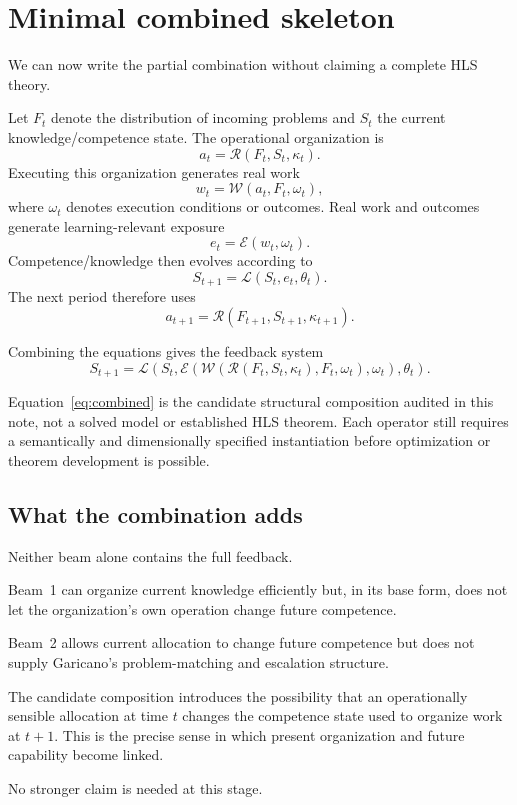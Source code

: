 \section{Minimal combined skeleton}

We can now write the partial combination without claiming a complete HLS theory.

Let \(F_t\) denote the distribution of incoming problems and \(S_t\) the current
knowledge/competence state. The operational organization is
\begin{equation}
a_t=\mathcal R(F_t,S_t,\kappa_t).
\end{equation}
Executing this organization generates real work
\begin{equation}
w_t=\mathcal W(a_t,F_t,\omega_t),
\end{equation}
where \(\omega_t\) denotes execution conditions or outcomes. Real work and outcomes generate
learning-relevant exposure
\begin{equation}
e_t=\mathcal E(w_t,\omega_t).
\end{equation}
Competence/knowledge then evolves according to
\begin{equation}
S_{t+1}=\mathcal L(S_t,e_t,\theta_t).
\end{equation}
The next period therefore uses
\begin{equation}
a_{t+1}=\mathcal R(F_{t+1},S_{t+1},\kappa_{t+1}).
\end{equation}

Combining the equations gives the feedback system
\begin{equation}
S_{t+1}
=
\mathcal L\!\left(
S_t,
\mathcal E\!\left(
\mathcal W\!\left(
\mathcal R(F_t,S_t,\kappa_t),
F_t,\omega_t
\right),
\omega_t
\right),
\theta_t
\right).
\label{eq:combined}
\end{equation}

Equation~\eqref{eq:combined} is the candidate structural composition audited in this note,
not a solved model or established HLS theorem. Each operator still requires a semantically
and dimensionally specified instantiation before optimization or theorem development is
possible.

\subsection{What the combination adds}

Neither beam alone contains the full feedback.

Beam~1 can organize current knowledge efficiently but, in its base form, does not let the
organization's own operation change future competence.

Beam~2 allows current allocation to change future competence but does not supply Garicano's
problem-matching and escalation structure.

The candidate composition introduces the possibility that an operationally sensible allocation at
time \(t\) changes the competence state used to organize work at \(t+1\). This is the precise
sense in which present organization and future capability become linked.

No stronger claim is needed at this stage.
